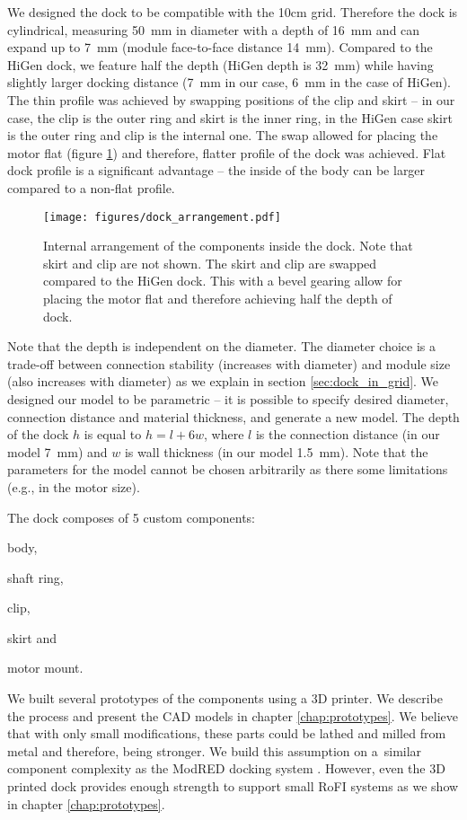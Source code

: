 We designed the dock to be compatible with the 10cm grid. Therefore the dock is
cylindrical, measuring 50~mm in diameter with a depth of 16~mm and can expand up
to 7~mm (module face-to-face distance 14~mm). Compared to the HiGen dock, we
feature half the depth (HiGen depth is 32~mm) while having slightly larger
docking distance (7~mm in our case, 6~mm in the case of HiGen). The thin profile
was achieved by swapping positions of the clip and skirt -- in our case, the
clip is the outer ring and skirt is the inner ring, in the HiGen case skirt is
the outer ring and clip is the internal one. The swap allowed for placing the
motor flat (figure \ref{fig:dock_internal_arrangement}) and therefore, flatter
profile of the dock was achieved. Flat dock profile is a significant advantage
-- the inside of the body can be larger compared to a non-flat profile.

\begin{figure}[!ht]
    \centering
    \texttt{[image: figures/dock\_arrangement.pdf]}
    \caption{Internal arrangement of the components inside the dock. Note that
    skirt and clip are not shown. The skirt and clip are swapped compared to the
    HiGen dock. This with a bevel gearing allow for placing the motor flat and
    therefore achieving half the depth of dock.}
    \label{fig:dock_internal_arrangement}
\end{figure}

Note that the depth is independent on the diameter. The diameter choice is a
trade-off between connection stability (increases with diameter) and module size
(also increases with diameter) as we explain in section \ref{sec:dock_in_grid}.
We designed our model to be parametric -- it is possible to specify desired
diameter, connection distance and material thickness, and generate a new model.
The depth of the dock $h$ is equal to $h=l+6w$, where $l$ is the connection
distance (in our model 7~mm) and $w$ is wall thickness (in our model 1.5~mm).
Note that the parameters for the model cannot be chosen arbitrarily as there
some limitations (e.g., in the motor size).

The dock composes of 5 custom components:
\begin{enumerate*}
    \item body,
    \item shaft ring,
    \item clip,
    \item skirt and
    \item motor mount.
\end{enumerate*}
We built several prototypes of the components using a 3D printer. We describe
the process and present the CAD models in chapter \ref{chap:prototypes}. We
believe that with only small modifications, these parts could be lathed and
milled from metal and therefore, being stronger. We build this assumption on
a~similar component complexity as the ModRED docking system
\cite{hossain_towards_2014}. However, even the 3D printed dock provides enough
strength to support small RoFI systems as we show in chapter
\ref{chap:prototypes}.

